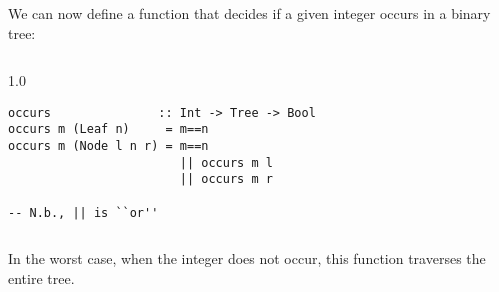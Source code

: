 \documentclass{beamer}
\newenvironment{execblock}[1][.8]{%
\begin{columns}
\begin{column}{#1\linewidth}
\begin{block}{}}{%
\end{block}
\end{column}
\end{columns}}
\def\frameskip{\vskip 0.1in}
\begin{document}
\begin{frame}[fragile]
\large

We can now define a function that decides if a given 
integer occurs in a binary tree: 

\frameskip

\begin{execblock}[1.0]
\begin{verbatim}
occurs               :: Int -> Tree -> Bool 
occurs m (Leaf n)     = m==n 
occurs m (Node l n r) = m==n 
                        || occurs m l 
                        || occurs m r 

-- N.b., || is ``or''
\end{verbatim}
\end{execblock}

\frameskip

In the worst case, when the integer does not 
occur, this function traverses the entire tree.

\end{frame}
\end{document}
